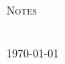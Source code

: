 \makeatletter
\begin{titlepage}
    \begin{fullwidth}    
        \begin{center}
            
                
            
            
            
            
            \LARGE
            \textsc{Notes}
            
            \vspace{5cm}
            
            \Huge
            \vspace{0.6em}
            \textbf{\@title}
            
            \vfill
            
            \Large
            {\@author}\\[10pt]
            

            
            \today
            
        \end{center}    
    \end{fullwidth}
\end{titlepage}